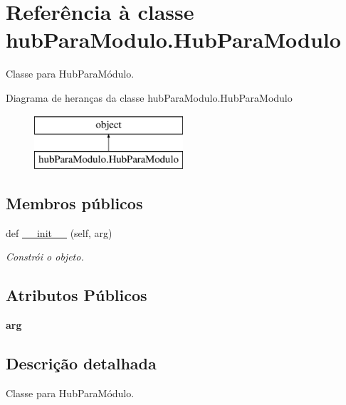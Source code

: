 \hypertarget{classhub_para_modulo_1_1_hub_para_modulo}{}\section{Referência à classe hub\+Para\+Modulo.\+Hub\+Para\+Modulo}
\label{classhub_para_modulo_1_1_hub_para_modulo}


Classe para Hub\+Para\+Módulo.  


Diagrama de heranças da classe hub\+Para\+Modulo.\+Hub\+Para\+Modulo\begin{figure}[H]
\begin{center}
\leavevmode
\includegraphics[height=2.000000cm]{classhub_para_modulo_1_1_hub_para_modulo}
\end{center}
\end{figure}
\subsection*{Membros públicos}
\begin{DoxyCompactItemize}
\item 
def \hyperlink{classhub_para_modulo_1_1_hub_para_modulo_abf63ddad3857ffe2c53bfa707a149c75}{\+\_\+\+\_\+init\+\_\+\+\_\+} (self, arg)
\begin{DoxyCompactList}\small\item\em Constrói o objeto. \end{DoxyCompactList}\end{DoxyCompactItemize}
\subsection*{Atributos Públicos}
\begin{DoxyCompactItemize}
\item 
{\bfseries arg}\hypertarget{classhub_para_modulo_1_1_hub_para_modulo_a0f8bf47693698c4d06489efcdfb73de9}{}\label{classhub_para_modulo_1_1_hub_para_modulo_a0f8bf47693698c4d06489efcdfb73de9}

\end{DoxyCompactItemize}


\subsection{Descrição detalhada}
Classe para Hub\+Para\+Módulo. 

